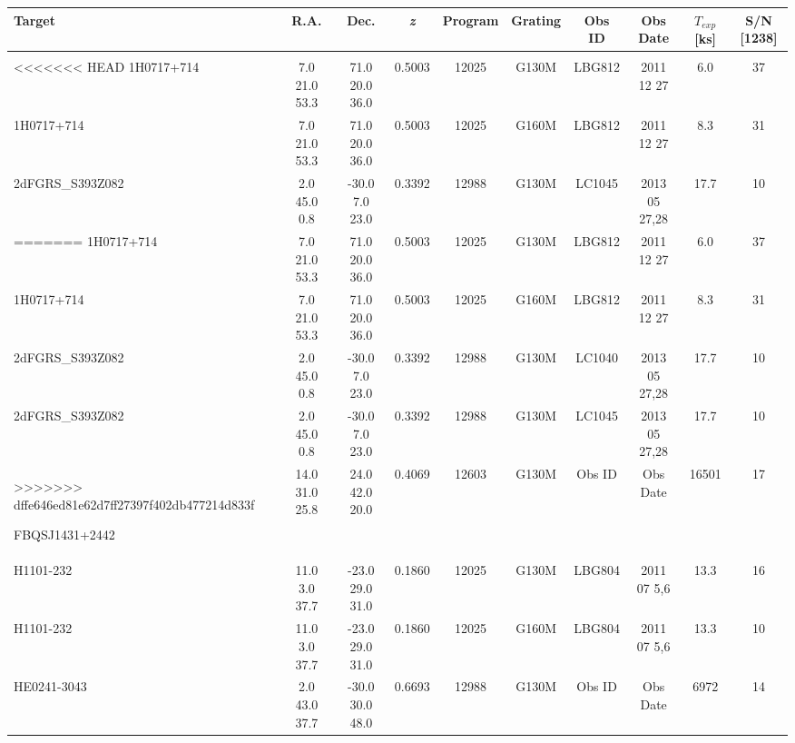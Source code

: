 \documentclass[iop]{emulateapj-rtx4}
\begin{document}
\begin{table}[ht]\footnotesize
\begin{center}
\begin{tabular}{l c c c c c c c c c}
 \hline \hline
  Target & R.A. & Dec. & \textit{z} & Program & Grating & Obs ID & Obs Date & $T_{exp}$ [ks] & S/N [1238] \\ \hline
   
\\
 
<<<<<<< HEAD
1H0717+714  &              7.0  21.0  53.3  &    71.0  20.0  36.0  &    0.5003  & 12025  &   G130M  &   LBG812  & 2011 12 27  &   6.0  &       37         \\
1H0717+714  &              7.0  21.0  53.3  &    71.0  20.0  36.0  &    0.5003  & 12025  &   G160M  &   LBG812  & 2011 12 27  &   8.3  &       31         \\
2dFGRS\_S393Z082  & 2.0  45.0    0.8  &     -30.0  7.0  23.0  &    0.3392  & 12988  &   G130M  &   LC1045   & 2013 05 27,28 & 17.7  &      10         \\
=======
1H0717+714        & 7.0  21.0   53.3  &     71.0  20.0  36.0  &    0.5003  & 12025  &   G130M  &   LBG812  & 2011 12 27    &  6.0  &      37         \\
1H0717+714        & 7.0  21.0   53.3  &     71.0  20.0  36.0  &    0.5003  & 12025  &   G160M  &   LBG812  & 2011 12 27    &  8.3  &      31         \\
2dFGRS\_S393Z082  & 2.0  45.0    0.8  &     -30.0  7.0  23.0  &    0.3392  & 12988  &   G130M  &   LC1040  & 2013 05 27,28 & 17.7  &      10         \\
2dFGRS\_S393Z082  & 2.0  45.0    0.8  &     -30.0  7.0  23.0  &    0.3392  & 12988  &   G130M  &   LC1045  & 2013 05 27,28 & 17.7  &      10         \\
>>>>>>> dffe646ed81e62d7ff27397f402db477214d833f

FBQSJ1431+2442  &          14.0  31.0  25.8  &   24.0  42.0  20.0  &    0.4069  & 12603  &   G130M  &   Obs ID  & Obs Date  & 16501  &      17         \\
H1101-232   &               11.0  3.0  37.7  &    -23.0  29.0  31.0  &   0.1860  & 12025  &   G130M  &   LBG804  & 2011 07 5,6  &   13.3  &      16         \\
H1101-232   &               11.0  3.0  37.7  &    -23.0  29.0  31.0  &   0.1860  & 12025  &   G160M  &   LBG804  & 2011 07 5,6  &   13.3  &      10         \\
HE0241-3043  &             2.0  43.0  37.7  &    -30.0  30.0  48.0  &   0.6693  & 12988  &   G130M  &   Obs ID  & Obs Date  & 6972  &       14         \\


\end{tabular}
\end{center}
\end{table}
\end{document}
